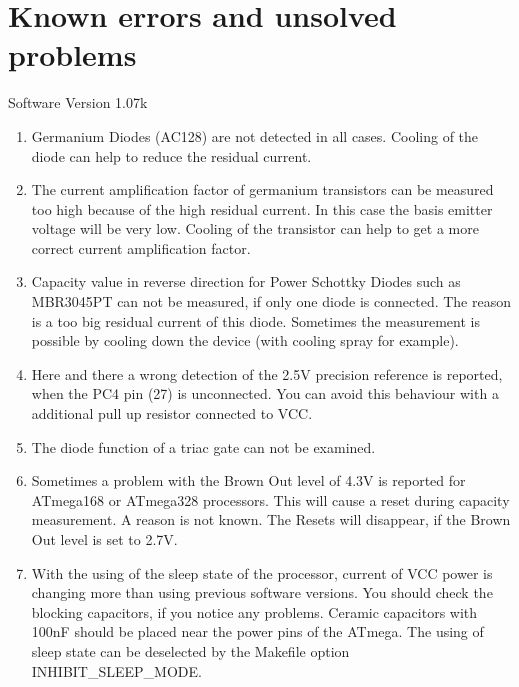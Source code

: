 
\chapter{Known errors and unsolved problems}
{\center Software Version 1.07k}

\begin{enumerate}

\item Germanium Diodes (AC128) are not detected in all cases.
Cooling of the diode can help to reduce the residual current.

\item The current amplification factor of germanium transistors can be measured too high because of
the high residual current. In this case the basis emitter voltage will be very low.
Cooling of the transistor can help to get a more correct current amplification factor.

\item Capacity value in reverse direction for Power Schottky Diodes such as MBR3045PT can not be measured,
if only one diode is connected. The reason is a too big residual current of this diode.
Sometimes the measurement is possible by cooling down the device (with  cooling spray for example).

\item Here and there  a wrong detection of the 2.5V precision reference is reported, when the PC4 pin (27) is unconnected.
You can avoid this behaviour with a additional pull up resistor connected to VCC.

\item The diode function of a triac gate can not be examined.

\item Sometimes a problem with the Brown Out level of 4.3V is reported for ATmega168 or ATmega328 processors.
This will cause a reset during capacity measurement. A reason is not known.
The Resets will disappear, if the Brown Out level is set to 2.7V.

\item With the using of the sleep state of the processor, current of VCC power is changing more than 
using previous software versions. You should check the blocking capacitors, if you notice any problems.
Ceramic capacitors with 100nF should be placed near the power pins of the ATmega. 
The using of sleep state can be deselected by the Makefile option INHIBIT\_SLEEP\_MODE.

\end{enumerate}
